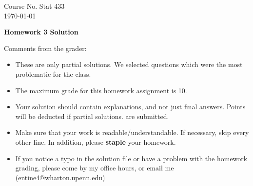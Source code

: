 \documentclass[10pt,a4paper]{article}
\begin{document}
\begin{flushleft}
Course No. Stat 433 \\
\today
\end{flushleft}

\begin{center}
{\Large{\bf  Homework 3 Solution}}
\end{center}

\textcolor[rgb]{0.98,0.00,0.00}{Comments from the grader:}
\begin{itemize}
    \item \textcolor[rgb]{0.98,0.00,0.00}{These are only partial solutions.  We selected
    questions which were the most problematic for the class.}
    \item \textcolor[rgb]{0.98,0.00,0.00}{The maximum grade for this homework assignment is 10.}
    \item \textcolor[rgb]{0.98,0.00,0.00}{Your solution should contain explanations, and not just
    final answers. Points will be deducted if partial solutions.
    are submitted.}
    \item \textcolor[rgb]{0.98,0.00,0.00}{Make sure that your work is readable/understandable.  If necessary, skip every other line.  In addition, please {\bf staple} your homework.}
    \item \textcolor[rgb]{0.98,0.00,0.00}{If you notice a typo in the solution file or have a problem with the homework
    grading, please come by my office hours, or email me (entine4@wharton.upenn.edu)}

\end{itemize}
\end{document}
